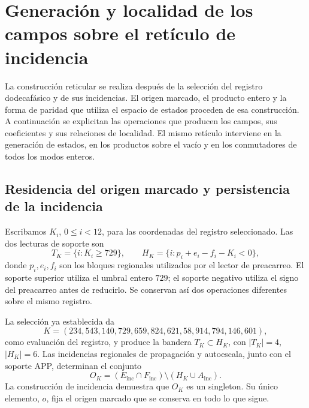 \section[Campos sobre el retículo de incidencia]{Generación y localidad de los campos sobre el retículo de incidencia}
\label{sec:df-campos-reticulares}

La construcción reticular se realiza después de la selección del registro
dodecafásico y de sus incidencias. El origen marcado, el producto entero y
la forma de paridad que utiliza el espacio de estados proceden de esa
construcción. A continuación se explicitan las operaciones que producen
los campos, sus coeficientes y sus relaciones de localidad. El mismo
retículo interviene en la generación de estados, en los productos sobre
el vacío y en los conmutadores de todos los modos enteros.

\subsection{Residencia del origen marcado y persistencia de la incidencia}


Escribamos \(K_i\), \(0\leq i<12\), para las coordenadas del registro
seleccionado. Las dos lecturas de soporte son
\begin{equation}
 T_K=\{i:K_i\geq729\},\qquad
 H_K=\{i:p_i+e_i-f_i-K_i<0\},
 \label{eq:df-soportes-K}
\end{equation}
donde \(p_i,e_i,f_i\) son los bloques regionales utilizados por el lector
de preacarreo. El soporte superior utiliza el umbral entero \(729\);
el soporte negativo utiliza el signo del preacarreo antes de reducirlo.
Se conservan así dos operaciones diferentes sobre el mismo registro.

La selección ya establecida da
\[
 K=(234,543,140,729,659,824,621,58,914,794,146,601),
\]
como evaluación del registro, y produce la bandera
\(T_K\subset H_K\), con \(|T_K|=4\), \(|H_K|=6\).
Las incidencias regionales de propagación y autoescala, junto con el
soporte APP, determinan el conjunto
\[
 O_K=(E_{\mathrm{inc}}\cap F_{\mathrm{inc}})
       \setminus(H_K\cup A_{\mathrm{inc}}).
\]
La construcción de incidencia demuestra que \(O_K\) es un singleton.
Su único elemento, \(o\), fija el origen marcado que se conserva en
todo lo que sigue.

